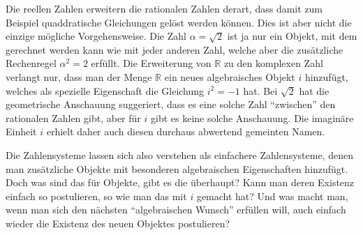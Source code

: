 Die reellen Zahlen erweitern die rationalen Zahlen derart, dass damit
zum Beispiel quaddratische Gleichungen gelöst werden können.
Dies ist aber nicht die einzige mögliche Vorgehensweise.
Die Zahl $\alpha=\sqrt{2}$ ist ja nur ein Objekt, mit dem gerechnet werden
kann wie mit jeder anderen Zahl, welche aber die zusätzliche Rechenregel
$\alpha^2=2$ erfüllt.
Die Erweiterung von $\mathbb{R}$ zu den komplexen Zahl verlangt nur,
dass man der Menge $\mathbb{R}$ ein neues algebraisches Objekt $i$
hinzufügt, welches als spezielle Eigenschaft die Gleichung $i^2=-1$ hat.
Bei $\sqrt{2}$ hat die geometrische Anschauung suggeriert, dass es eine
solche Zahl ``zwischen'' den rationalen Zahlen gibt, aber für $i$
gibt es keine solche Anschauung.
Die imaginäre Einheit $i$ erhielt daher auch diesen durchaus 
abwertend gemeinten Namen.

Die Zahlensysteme lassen sich also verstehen als einfachere Zahlensysteme,
denen man zusätzliche Objekte mit besonderen algebraischen Eigenschaften
hinzufügt.
Doch was sind das für Objekte, gibt es die überhaupt?
Kann man deren Existenz einfach so postulieren, so wie man das mit $i$ 
gemacht hat?
Und was macht man, wenn man sich den nächsten ``algebraischen Wunsch''
erfüllen will, auch einfach wieder die Existenz des neuen Objektes
postulieren?

